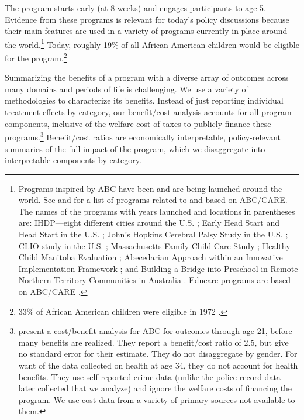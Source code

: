 The program starts early (at 8 weeks) and engages participants to age 5. Evidence from these programs is relevant for today's policy discussions because their main features are used in a variety of programs currently in place around the world.\footnote{Programs inspired by ABC have been and are being launched around the world. See \citet{Sparling_2010_Highlights} and \citet{Ramey_Ramey_Lanzi_2014_Interventions} for a list of programs related to and based on ABC/CARE. The names of the programs with years launched and locations in parentheses are: IHDP---eight different cities around the U.S. \citep{Spiker-etal_1997_Helping}; Early Head Start and Head Start in the U.S. \citep{Schneider_McDonald-eds_2007_Scale-Up_Vol-1}; John's Hopkins Cerebral Palsy Study in the U.S. \citep{Sparling_2010_Highlights}; CLIO study in the U.S. \citep{Sparling_2010_Highlights}; Massachusetts Family Child Care Study \citep{Collins_etal_2010_Massachusetts-Study}; Healthy Child Manitoba Evaluation \citep{Healthy_Child_Manitoba_2015_Starting-Early}; Abecedarian Approach within an Innovative Implementation Framework \citep{Jensen_Nielsen_2016_ABC-Programme-Pilot}; and Building a Bridge into Preschool in Remote Northern Territory Communities in Australia \citep{UMonash_Dataset_2015_URL}. Educare programs are based on ABC/CARE \citep{Educare_2014_Research_Agenda,Yazejian_Bryant_2012_Educare}.} Today, roughly 19\% of all African-American children would be eligible for the program.\footnote{33\% of African American children were eligible in 1972 \citep{Garcia_2016_National-Implementation-ECI}.}

Summarizing the benefits of a program with a diverse array of outcomes across many domains and periods of life is challenging. We use a variety of methodologies to characterize its benefits. Instead of just reporting individual treatment effects by category, our benefit/cost analysis accounts for all program components, inclusive of the welfare cost of taxes to publicly finance these programs.\footnote{\cite{Barnett_Masse_2002_benefitcost,Barnett_Masse_2007_EER} present a cost/benefit analysis for ABC for outcomes through age 21, before many benefits are realized. They report a benefit/cost ratio of 2.5, but give no standard error for their estimate. They do not disaggregate by gender. For want of the data collected on health at age 34, they do not account for health benefits. They use self-reported crime data (unlike the police record data later collected that we analyze) and ignore the welfare costs of financing the program. We use cost data from a variety of primary sources not available to them.} Benefit/cost ratios are economically interpretable, policy-relevant summaries of the full impact of the program, which we disaggregate into interpretable components by category.

